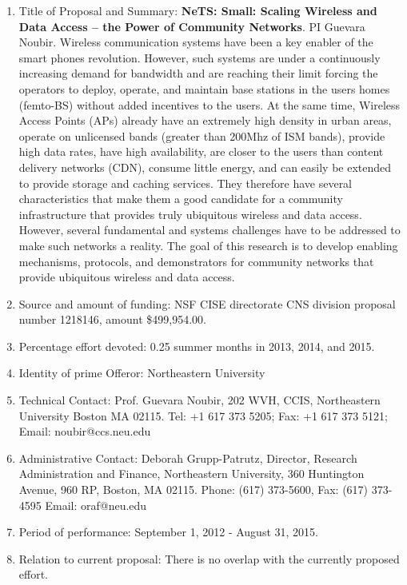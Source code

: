 \begin{enumerate}
\item Title of Proposal and Summary: {\bf NeTS: Small: Scaling Wireless
  and Data Access – the Power of Community Networks}.  PI Guevara
  Noubir.  Wireless communication systems have been a key enabler of
  the smart phones revolution. However, such systems are under a
  continuously increasing demand for bandwidth and are reaching their
  limit forcing the operators to deploy, operate, and maintain base
  stations in the users homes (femto-BS) without added incentives to
  the users. At the same time, Wireless Access Points (APs) already
  have an extremely high density in urban areas, operate on unlicensed
  bands (greater than 200Mhz of ISM bands), provide high data rates,
  have high availability, are closer to the users than content
  delivery networks (CDN), consume little energy, and can easily be
  extended to provide storage and caching services. They therefore
  have several characteristics that make them a good candidate for a
  community infrastructure that provides truly ubiquitous wireless and
  data access. However, several fundamental and systems challenges
  have to be addressed to make such networks a reality.  The goal of
  this research is to develop enabling mechanisms, protocols, and
  demonstrators for community networks that provide ubiquitous
  wireless and data access.
\item Source and amount of funding: NSF CISE directorate CNS division
  proposal number 1218146, amount \$499,954.00.
\item Percentage effort devoted: 0.25 summer months in 2013, 2014, and 2015.
\item Identity of prime Offeror: Northeastern University
\item Technical Contact: Prof. Guevara Noubir,  202 WVH, CCIS, Northeastern University
Boston MA 02115.  Tel: +1 617 373 5205;  Fax: +1 617 373 5121;  Email: noubir@ccs.neu.edu 
\item Administrative Contact: Deborah Grupp-Patrutz, Director,
  Research Administration and Finance, Northeastern University, 360
  Huntington Avenue, 960 RP, Boston, MA 02115. Phone: (617) 373-5600,
  Fax: (617) 373-4595 Email: oraf@neu.edu
\item  Period of performance: September 1, 2012 - August 31, 2015.
\item Relation to current proposal: There is no overlap with the currently proposed effort.
\end{enumerate}

